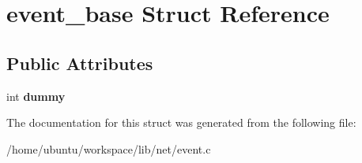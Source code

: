 \hypertarget{structevent__base}{\section{event\-\_\-base Struct Reference}
\label{structevent__base}
}
\subsection*{Public Attributes}
\begin{DoxyCompactItemize}
\item 
\hypertarget{structevent__base_a2a9980f06a6926acffcfccb88b5583fd}{int {\bfseries dummy}}\label{structevent__base_a2a9980f06a6926acffcfccb88b5583fd}

\end{DoxyCompactItemize}


The documentation for this struct was generated from the following file\-:\begin{DoxyCompactItemize}
\item 
/home/ubuntu/workspace/lib/net/event.\-c\end{DoxyCompactItemize}
